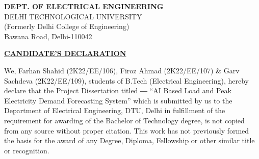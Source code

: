 \documentclass[12pt,a4paper]{report}
\begin{document}
\thispagestyle{empty}

\newpage



\newpage




\begin{center}


\begin{center}
\textbf{DEPT. OF ELECTRICAL ENGINEERING}\\

DELHI TECHNOLOGICAL UNIVERSITY \\
(Formerly Delhi College of Engineering) \\
Bawana Road, Delhi-110042\\
\end{center}
\vspace{2 cm}
\textbf{\underline{CANDIDATE’S DECLARATION}}\\
\end{center}
\vspace{1.2cm}
We, Farhan Shahid (2K22/EE/106), Firoz Ahmad (2K22/EE/107) \& Garv Sachdeva (2K22/EE/109), students of B.Tech (Electrical Engineering), hereby declare that the Project Dissertation titled ― “AI Based Load and Peak Electricity Demand Forecasting System” which is submitted by us to the Department of Electrical Engineering, DTU, Delhi in fulfillment of the requirement for awarding of the Bachelor of Technology degree, is not copied from any source without proper citation. This work has not previously formed the basis for the award of any Degree, Diploma, Fellowship or other similar title or recognition.
\end{document}
